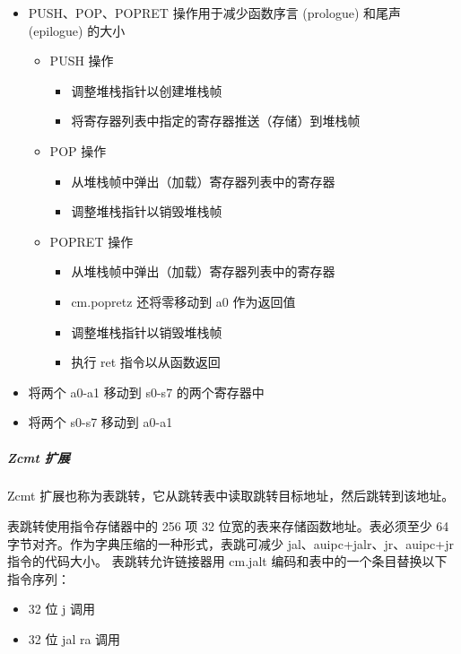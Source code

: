 \documentclass[main\_\_CN.tex]{subfiles}
\begin{document}
\begin{itemize}
    \item PUSH、POP、POPRET 操作用于减少函数序言 (prologue) 和尾声 (epilogue) 的大小
        \begin{itemize}
            \item PUSH 操作
                \begin{itemize}
                    \item 调整堆栈指针以创建堆栈帧
                    \item 将寄存器列表中指定的寄存器推送（存储）到堆栈帧
                \end{itemize}
            \item POP 操作
                \begin{itemize}
                    \item 从堆栈帧中弹出（加载）寄存器列表中的寄存器
                    \item 调整堆栈指针以销毁堆栈帧
                \end{itemize}
            \item POPRET 操作
                \begin{itemize}
                    \item 从堆栈帧中弹出（加载）寄存器列表中的寄存器
                    \item cm.popretz 还将零移动到 a0 作为返回值
                    \item 调整堆栈指针以销毁堆栈帧
                    \item 执行 ret 指令以从函数返回
                \end{itemize}
        \end{itemize}
    \item 将两个 a0-a1 移动到 s0-s7 的两个寄存器中
    \item 将两个 s0-s7 移动到 a0-a1
\end{itemize}

\subparagraph{Zcmt 扩展}

Zcmt 扩展也称为表跳转，它从跳转表中读取跳转目标地址，然后跳转到该地址。

表跳转使用指令存储器中的 256 项 32 位宽的表来存储函数地址。表必须至少 64 字节对齐。作为字典压缩的一种形式，表跳可减少 jal、auipc+jalr、jr、auipc+jr 指令的代码大小。
表跳转允许链接器用 cm.jalt 编码和表中的一个条目替换以下指令序列：
\begin{itemize}
    \item 32 位 j 调用
    \item 32 位 jal ra 调用
\end{itemize}
\end{document}

